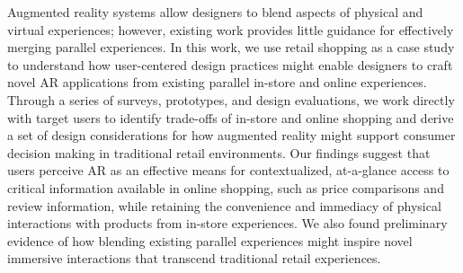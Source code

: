 Augmented reality systems allow designers to blend aspects of physical and virtual experiences; however, existing work provides little guidance for effectively merging parallel experiences. In this work, we use retail shopping as a case study to understand how user-centered design practices might enable designers to craft novel AR applications from existing parallel in-store and online experiences. Through a series of surveys, prototypes, and design evaluations, we work directly with target users to identify trade-offs of in-store and online shopping and derive a set of design considerations for how augmented reality might support consumer decision making in traditional retail environments. Our findings suggest that users perceive AR as an effective means for contextualized, at-a-glance access to critical information available in online shopping, such as price comparisons and review information, while retaining the convenience and immediacy of physical interactions with products from in-store experiences.  We also found preliminary evidence of how blending existing parallel experiences might inspire novel immersive interactions that transcend traditional retail experiences. 
